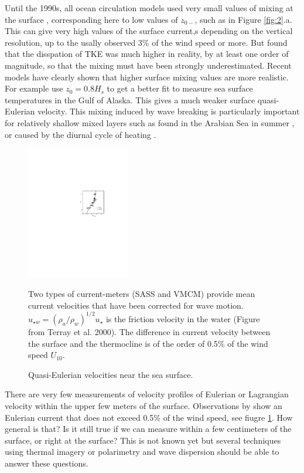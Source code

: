 Until the 1990s, all ocean circulation models used very small values of mixing at the surface \citep[e.g.][]{Large&al.1994}, corresponding 
here to low values of $z_{0-}$, such as in Figure \ref{fig:2}.a. This can give very high values of the surface current,s depending on the vertical resolution, 
up to the usally observed 3\% of the wind speed 
\citep{Huang1979} or more. But \cite{Agrawal&al.1992} found that the disspation of TKE was much higher in reality, by at least 
one order of magnitude, so that the mixing must have been strongly underestimated.  Recent models have clearly shown that 
higher surface mixing values are more realistic. For example \cite{Mellor&Blumberg2004} use  $z_0=0.8 H_s$ to get a better fit to measure sea surface temperatures 
in the Gulf of Alaska. This gives a much weaker surface quasi-Eulerian velocity.  This mixing induced by wave breaking is particularly important for 
relatively shallow mixed layers such as found in the Arabian Sea in summer \citep{Janssen2012}, or caused by the diurnal cycle of heating \citep{Noh1996,Noh&Kim1999}.

\begin{figure}
\centerline{\includegraphics[width=0.4\textwidth]{FIGS_CH_AIRSEA/Terray_etal2000_p5.pdf}}
  \caption{Quasi-Eulerian velocities near the sea surface.}{Two types of current-meters  (SASS and VMCM) provide mean current velocities that have been corrected for wave motion. $u_{\star w}=(\rho_a/\rho_w)^{1/2} u_{\star}$ is the friction velocity in the water (Figure from Terray et al. 2000)\nocite{Terray&al.2000}. The difference in current velocity between the surface and the thermocline is of the order of  0.5\% 
  of the wind speed $U_{10}$.} \label{fig_Santala}
\end{figure}
There are very few measurements of velocity profiles of Eulerian or Lagrangian velocity within the upper 
few meters of the surface. Observations by \cite{Santala&Terray1992} show an Eulerian current that does not exceed  0.5\% of the wind 
speed, see fiugre
\ref{fig_Santala}. 
How general is that? Is it still true if we can measure within a few centimeters of the surface, or right at the surface? 
This is not known yet but several techniques using thermal imagery or polarimetry and wave dispersion should be able to answer these questions. 


